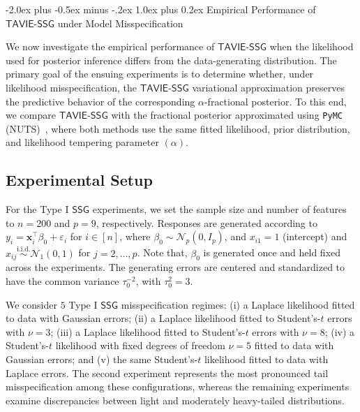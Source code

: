 \documentclass[12pt]{article}
\makeatletter
\def\section{\@startsection{section}{1}{\z@}
  {-2.0ex plus -0.5ex minus -.2ex} %
  {1.0ex plus 0.2ex}               %
  {\normalfont\Large\bfseries}}
\numberwithin{equation}{section}
\newcommand{\ssg}{\mathsf{SSG}}
\newcommand{\tssg}{\mathsf{TAVIE}\text{-}\mathsf{SSG}}
\makeatother
\begin{document}
\newpage

\section{Empirical Performance of \texorpdfstring{$\tssg$}{TAVIE-SSG} under Model Misspecification}
\label{app:model-misspecification-empirics}

We now investigate the empirical performance of $\tssg$ when the likelihood used for posterior inference differs from the data-generating distribution. The primary goal of the ensuing experiments is to determine whether, under likelihood misspecification, the $\tssg$ variational approximation preserves the predictive behavior of the corresponding $\alpha$-fractional posterior. To this end, we compare $\tssg$ with the fractional posterior approximated using \texttt{PyMC} (NUTS)~\citep{pymc,pymc2023peerj}, where both methods use the same fitted likelihood, prior distribution, and likelihood tempering parameter $(\alpha)$.

\subsection{Experimental Setup}
\label{app:model-misspecification-empirics-settings}

For the Type I $\ssg$ experiments, we set the sample size and number of features to $n=200$ and $p=9$, respectively. Responses are generated according to $y_i = \mathbf{x}_i^{\top}\beta_0 + \varepsilon_i$ for $i\in [n]$, where $\beta_0\sim \mathcal{N}_{p}(0, I_{p})$, and $x_{i1} = 1$ (intercept) and $x_{ij} \stackrel{\mathrm{i.i.d.}}{\sim}\mathcal{N}_{1}(0, 1)$ for $j=2, \ldots, p$. Note that, $\beta_0$ is generated once and held fixed across the experiments. The generating errors are centered and standardized to have the common variance $\tau_0^{-2}$, with $\tau_0^{2} = 3$.

We consider $5$ Type I $\ssg$ misspecification regimes: (i) a Laplace likelihood fitted to data with Gaussian errors; (ii) a Laplace likelihood fitted to Student's-$t$ errors with $\nu=3$; (iii) a Laplace likelihood fitted to Student's-$t$ errors with $\nu=8$; (iv) a Student's-$t$ likelihood with fixed degrees of freedom $\nu=5$ fitted to data with Gaussian errors; and (v) the same Student's-$t$ likelihood fitted to data with Laplace errors. The second experiment represents the most pronounced tail misspecification among these configurations, whereas the remaining experiments examine discrepancies between light and moderately heavy-tailed distributions.
\end{document}
